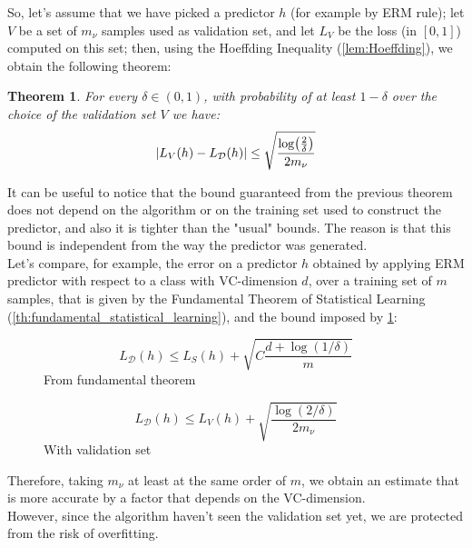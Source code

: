 \documentclass[12pt]{report}
\theoremstyle{plain}
\newtheorem{theorem}{Theorem}[chapter]
\newcommand\mcl[1]{\mathcal{#1}}
\begin{document}
\begin{flushleft}
So, let's assume that we have picked a predictor $h$ (for example by ERM rule); 
let $V$ be a set of $m_\nu$ samples used as validation set, and let $L_V$ be 
the loss (in $[0,1]$) computed on this set; then, using the Hoeffding 
Inequality (\ref{lem:Hoeffding}), we obtain the following theorem:
\begin{theorem}
	For every $\delta\in(0,1)$, with probability of at least $1-\delta$ over 
	the choice of the validation set $V$ we have:
	\[ 
	\abs{L_V(h)-L_\mcl{D}(h)}\leq\sqrt{\frac{\log(\frac{2}{\delta})}{2m_\nu}} \]
\label{th:validation_theorem}
\end{theorem}
It can be useful to notice that the bound guaranteed from the previous theorem 
does not depend on the algorithm or on the training set used to construct the 
predictor, and also it is tighter than the "usual" bounds. The reason is that 
this bound is independent from the way the predictor was generated.\\
Let's compare, for example, the error on a predictor $h$ obtained by applying 
ERM predictor with respect to a class with VC-dimension $d$, over a training 
set of $m$ samples, that is given by the Fundamental Theorem of Statistical 
Learning (\ref{th:fundamental_statistical_learning}), and the bound imposed by 
\ref{th:validation_theorem}:\\
\vspace{0.5cm}
\begin{figure}[!h]
	\begin{minipage}{0.5\textwidth}
		\[ L_\mcl{D}(h)\leq L_S(h)+\sqrt{C\frac{d+\log(1/\delta)}{m}} \]
		\centering
		\vspace{0.3cm}
		From fundamental theorem
	\end{minipage}
	\begin{minipage}{0.5\textwidth}
		\[ L_\mcl{D}(h)\leq L_V(h)+\sqrt{\frac{\log(2/\delta)}{2m_\nu}} \]
		\centering
		\vspace{0.3cm}
		With validation set
	\end{minipage}
\end{figure}

Therefore, taking $m_\nu$ at least at the same order of $m$, we obtain an 
estimate that is more accurate by a factor that depends on the VC-dimension.\\
However, since the algorithm haven't seen the validation set yet, we are 
protected from the risk of overfitting.\\



\end{flushleft}
\end{document}

